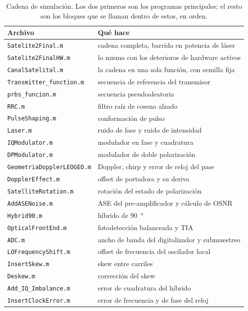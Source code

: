 \begin{table}[htbp]
  \centering
  \small
  \begin{tabular}{ll}
    \toprule
    Archivo & Qu\'e hace \\
    \midrule
    \texttt{Satelite2Final.m}        & cadena completa, barrida en potencia de l\'aser \\
    \texttt{Satelite2FinalHW.m}      & lo mismo con los deterioros de hardware activos \\
    \texttt{CanalSatelital.m}        & la cadena en una sola funci\'on, con semilla fija \\
    \midrule
    \texttt{Transmitter\_function.m} & secuencia de referencia del transmisor \\
    \texttt{prbs\_funcion.m}         & secuencia pseudoaleatoria \\
    \texttt{RRC.m}                   & filtro ra\'iz de coseno alzado \\
    \texttt{PulseShaping.m}          & conformaci\'on de pulso \\
    \texttt{Laser.m}                 & ruido de fase y ruido de intensidad \\
    \texttt{IQModulator.m}           & modulador en fase y cuadratura \\
    \texttt{DPModulator.m}           & modulador de doble polarizaci\'on \\
    \texttt{GeometriaDopplerLEOGEO.m}& Doppler, chirp y error de reloj del pase \\
    \texttt{DopplerEffect.m}         & offset de portadora y su deriva \\
    \texttt{SatelliteRotation.m}     & rotaci\'on del estado de polarizaci\'on \\
    \texttt{AddASENoise.m}           & ASE del pre-amplificador y c\'alculo de OSNR \\
    \texttt{Hybrid90.m}              & h\'ibrido de \SI{90}{\degree} \\
    \texttt{OpticalFrontEnd.m}       & fotodetecci\'on balanceada y TIA \\
    \texttt{ADC.m}                   & ancho de banda del digitalizador y submuestreo \\
    \texttt{LOFrequencyShift.m}      & offset de frecuencia del oscilador local \\
    \texttt{InsertSkew.m}            & skew entre carriles \\
    \texttt{Deskew.m}                & correcci\'on del skew \\
    \texttt{Add\_IQ\_Imbalance.m}    & error de cuadratura del h\'ibrido \\
    \texttt{InsertClockError.m}      & error de frecuencia y de fase del reloj \\
    \bottomrule
  \end{tabular}
  \caption[Programas de la cadena de simulaci\'on]{%
    Cadena de simulaci\'on. Los dos primeros son los programas principales; el
    resto son los bloques que se llaman dentro de estos, en  orden.}
  \label{tab:ap-codigos-cadena}
\end{table}

